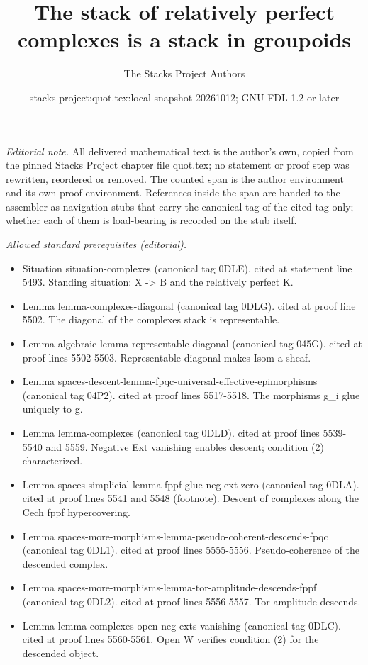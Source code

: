 \documentclass{stacks-project}
\title{The stack of relatively perfect complexes is a stack in groupoids}
\author{The Stacks Project Authors}
\date{stacks-project:quot.tex:local-snapshot-20261012; GNU FDL 1.2 or later}
\theoremstyle{plain}
\theoremstyle{definition}
\theoremstyle{remark}
\numberwithin{equation}{subsection}
\begin{document}
\maketitle
\setcounter{subsection}{1}
\noindent\textit{Editorial note.} All delivered mathematical text is the author's own, copied from the pinned Stacks Project chapter file quot.tex; no statement or proof step was rewritten, reordered or removed. The counted span is the author environment and its own proof environment. References inside the span are handed to the assembler as navigation stubs that carry the canonical tag of the cited tag only; whether each of them is load-bearing is recorded on the stub itself.\par\medskip
\noindent\textit{Allowed standard prerequisites (editorial).}\begin{itemize}
\item Situation situation-complexes (canonical tag 0DLE). cited at statement line 5493. Standing situation: X -> B and the relatively perfect K.
\item Lemma lemma-complexes-diagonal (canonical tag 0DLG). cited at proof line 5502. The diagonal of the complexes stack is representable.
\item Lemma algebraic-lemma-representable-diagonal (canonical tag 045G). cited at proof lines 5502-5503. Representable diagonal makes Isom a sheaf.
\item Lemma spaces-descent-lemma-fpqc-universal-effective-epimorphisms (canonical tag 04P2). cited at proof lines 5517-5518. The morphisms g\_i glue uniquely to g.
\item Lemma lemma-complexes (canonical tag 0DLD). cited at proof lines 5539-5540 and 5559. Negative Ext vanishing enables descent; condition (2) characterized.
\item Lemma spaces-simplicial-lemma-fppf-glue-neg-ext-zero (canonical tag 0DLA). cited at proof lines 5541 and 5548 (footnote). Descent of complexes along the Cech fppf hypercovering.
\item Lemma spaces-more-morphisms-lemma-pseudo-coherent-descends-fpqc (canonical tag 0DL1). cited at proof lines 5555-5556. Pseudo-coherence of the descended complex.
\item Lemma spaces-more-morphisms-lemma-tor-amplitude-descends-fppf (canonical tag 0DL2). cited at proof lines 5556-5557. Tor amplitude descends.
\item Lemma lemma-complexes-open-neg-exts-vanishing (canonical tag 0DLC). cited at proof lines 5560-5561. Open W verifies condition (2) for the descended object.
\end{itemize}\medskip
\end{document}
